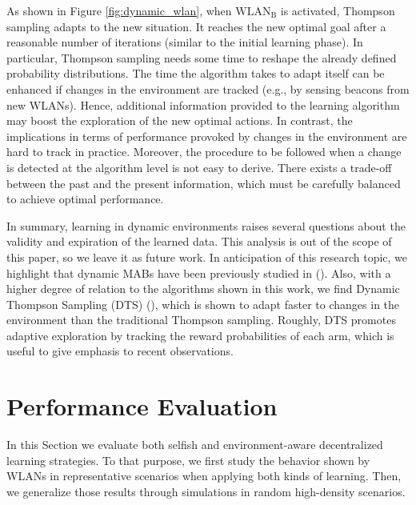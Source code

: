 \documentclass{article}
\begin{document}
As shown in Figure \ref{fig:dynamic_wlan}, when $\text{WLAN}_\text{B}$ is activated, Thompson sampling adapts to the new situation. It reaches the new optimal goal after a reasonable number of iterations (similar to the initial learning phase). In particular, Thompson sampling needs some time to reshape the already defined probability distributions. The time the algorithm takes to adapt itself can be enhanced if changes in the environment are tracked (e.g., by sensing beacons from new WLANs). Hence, additional information provided to the learning algorithm may boost the exploration of the new optimal actions. In contrast, the implications in terms of performance provoked by changes in the environment are hard to track in practice. Moreover, the procedure to be followed when a change is detected at the algorithm level is not easy to derive. There exists a trade-off between the past and the present information, which must be carefully balanced to achieve optimal performance.

In summary, learning in dynamic environments raises several questions about the validity and expiration of the learned data. This analysis is out of the scope of this paper, so we leave it as future work. In anticipation of this research topic, we highlight that dynamic MABs have been previously studied in (\citealp{hartland2006multi}). Also, with a higher degree of relation to the algorithms shown in this work, we find Dynamic Thompson Sampling (DTS) (\citealp{gupta2011thompson}), which is shown to adapt faster to changes in the environment than the traditional Thompson sampling. Roughly, DTS promotes adaptive exploration by tracking the reward probabilities of each arm, which is useful to give emphasis to recent observations.

\section{Performance Evaluation}			
\label{section:performance_evaluation}				
In this Section we evaluate both selfish and environment-aware decentralized learning strategies. To that purpose, we first study the 
behavior shown by WLANs in representative scenarios when applying both kinds of learning. Then, we generalize those results through simulations in random high-density scenarios.

\end{document}
